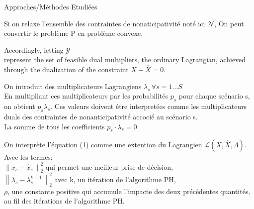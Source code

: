 \documentclass[10pt]{beamer}
\newcommand{\Lagr}{\mathcal{L}}
\newcommand\norm[1]{\left\lVert#1\right\rVert}
\begin{document}
    \begin{section}{Approches/Méthodes Etudiées}
    
    \begin{frame}
        Si on relaxe l'ensemble des contraintes de nonaticipativité noté ici $\mathcal{N}$, On peut convertir le problème P en problème convexe.
    \end{frame}
    
    \begin{frame}
        Accordingly, letting $\mathcal{Y}$\\ %
        represent the set of feasible dual multipliers, the ordinary Lagrangian, achieved through the dualization
of the constraint $X - \hat{X} = 0$.
    \end{frame}
    
    
    \begin{frame}
        On introduit des multiplicateurs Lagrangiens $\lambda_s \, \forall s = 1 \ldots S$\\
        En multipliant ces multiplicateurs par les probabilités $p_s$ pour chaque scénario s, on obtient $p_s\lambda_s$. Ces valeurs doivent être interpretées comme les multiplicateurs duals des contraintes de nonanticipativité accocié au scénario s.\\
        La somme de tous les coefficients $p_s\cdot\lambda_s = 0$
    \end{frame}
    
    \begin{frame}
        On interprète l'équation (1) comme une extention du Lagrangien $\Lagr(X, \hat{X}, \Lambda)$.\\
            
        Avec les termes:\\
        $\norm{x_s - \hat{x}_s}^{2}_{2}$ qui permet une meilleur prise de décision,\\
        $\norm{\lambda_s - \lambda^{k-1}_{s}}^{2}_{2}$ avec k, un itération de l'algorithme PH,\\
        $\rho$, une constante positive qui accumule l'impacte des deux précédentes quantités, au fil des itérations de l'algorithme PH.
    \end{frame}
    

\end{section}
\end{document}
